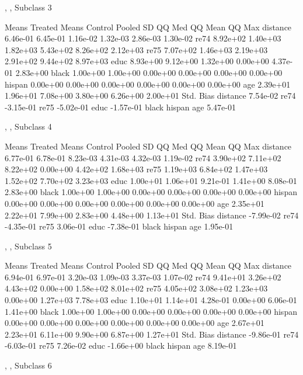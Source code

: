 \documentclass[oneside,letterpaper,titlepage]{article}
\begin{document}
\begin{enumerate}
\begin{Schunk}
\begin{Soutput}
, , Subclass 3

         Means Treated Means Control Pooled SD    QQ Med   QQ Mean    QQ Max
distance      6.46e-01      6.45e-01  1.16e-02  1.32e-03  2.86e-03  1.30e-02
re74          8.92e+02      1.40e+03  1.82e+03  5.43e+02  8.26e+02  2.12e+03
re75          7.07e+02      1.46e+03  2.19e+03  2.91e+02  9.44e+02  8.97e+03
educ          8.93e+00      9.12e+00  1.32e+00  0.00e+00  4.37e-01  2.83e+00
black         1.00e+00      1.00e+00  0.00e+00  0.00e+00  0.00e+00  0.00e+00
hispan        0.00e+00      0.00e+00  0.00e+00  0.00e+00  0.00e+00  0.00e+00
age           2.39e+01      1.96e+01  7.08e+00  3.80e+00  6.26e+00  2.00e+01
         Std. Bias
distance  7.54e-02
re74     -3.15e-01
re75     -5.02e-01
educ     -1.57e-01
black             
hispan            
age       5.47e-01

, , Subclass 4

         Means Treated Means Control Pooled SD    QQ Med   QQ Mean    QQ Max
distance      6.77e-01      6.78e-01  8.23e-03  4.31e-03  4.32e-03  1.19e-02
re74          3.90e+02      7.11e+02  8.22e+02  0.00e+00  4.42e+02  1.68e+03
re75          1.19e+03      6.84e+02  1.47e+03  1.52e+02  7.70e+02  3.23e+03
educ          1.00e+01      1.06e+01  9.21e-01  1.41e+00  8.08e-01  2.83e+00
black         1.00e+00      1.00e+00  0.00e+00  0.00e+00  0.00e+00  0.00e+00
hispan        0.00e+00      0.00e+00  0.00e+00  0.00e+00  0.00e+00  0.00e+00
age           2.35e+01      2.22e+01  7.99e+00  2.83e+00  4.48e+00  1.13e+01
         Std. Bias
distance -7.99e-02
re74     -4.35e-01
re75      3.06e-01
educ     -7.38e-01
black             
hispan            
age       1.95e-01

, , Subclass 5

         Means Treated Means Control Pooled SD    QQ Med   QQ Mean    QQ Max
distance      6.94e-01      6.97e-01  3.20e-03  1.09e-03  3.37e-03  1.07e-02
re74          9.41e+01      3.26e+02  4.43e+02  0.00e+00  1.58e+02  8.01e+02
re75          4.05e+02      3.08e+02  1.23e+03  0.00e+00  1.27e+03  7.78e+03
educ          1.10e+01      1.14e+01  4.28e-01  0.00e+00  6.06e-01  1.41e+00
black         1.00e+00      1.00e+00  0.00e+00  0.00e+00  0.00e+00  0.00e+00
hispan        0.00e+00      0.00e+00  0.00e+00  0.00e+00  0.00e+00  0.00e+00
age           2.67e+01      2.23e+01  6.11e+00  9.90e+00  6.87e+00  1.27e+01
         Std. Bias
distance -9.86e-01
re74     -6.03e-01
re75      7.26e-02
educ     -1.66e+00
black             
hispan            
age       8.19e-01

, , Subclass 6


\end{Soutput}
\end{Schunk}
\end{enumerate}
\end{document}
